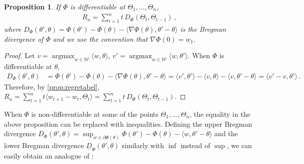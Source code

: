 \documentclass[english]{article}
\newcommand{\todoc}[2][]{\todo[color=Apricot!20,size=\tiny,#1]{C: #2}}
\newcommand{\cW}{\mathcal{W}}
\newcommand{\inpro}[2]{\langle #1, #2\rangle}
\newcommand{\ip}[1]{\langle#1\rangle}
\newcommand{\uD}{\overline{D}}
\newcommand{\lD}{\underline{D}}
\DeclareMathOperator*{\argmax}{argmax}
\newtheorem{prop}[thm]{Proposition}
\begin{document}
\begin{prop} 
\label{prop:R_nBregmanDivergence}
If $\Phi$ is differentiable at $\Theta_1, \ldots, \Theta_n$,  %
\begin{align}
\label{eq:regreteq}
R_n = \sum_{t=1}^{n} t\,D_{\Phi}(\Theta_t,\Theta_{t-1})\,,
\end{align}
where $D_{\Phi}(\theta', \theta) = \Phi(\theta') - \Phi(\theta) - \ip{ \nabla\Phi(\theta), \theta' - \theta}$ is the Bregman divergence of $\Phi$
and
we use the convention that $\nabla\Phi(0) = w_1$.
\end{prop}
\begin{proof}
Let $v = \argmax_{w\in\cW}\inpro{w}{\theta}$, 
$v' = \argmax_{w\in \cW}\ip{w,\theta'}$.
When $\Phi$ is differentiable at $\theta$,
\begin{align}
D_{\Phi}(\theta', \theta) & = \Phi(\theta') - \Phi(\theta) - \inpro{\nabla\Phi(\theta)}{\theta' \!- \theta} 
  =  \inpro{v'}{\theta'} \!- \inpro{v}{\theta} -\inpro{v}{\theta' \!- \theta} = \inpro{v'\!-v}{\theta'}\,. 
\label{eq:bregman}
\end{align}
Therefore, by \cref{prop:regretabel}, $R_n = \sum_{t=1}^{n} t\ip{ w_{t+1}-w_t,\Theta_t} = \sum_{t=1}^{n} t\,D_{\Phi}(\Theta_t,\Theta_{t-1})$.
\end{proof}
When $\Phi$ is non-differentiable at some of the points $\Theta_1,\dots,\Theta_n$, the equality in the above proposition can be replaced with inequalities.
Defining the upper Bregman divergence %
$\uD_{\Phi}(\theta', \theta) 
= \sup_{w\in \partial \Phi(\theta)} \Phi(\theta') - \Phi(\theta) - \ip{ w, \theta' - \theta}$ and the lower Bregman divergence $\lD_{\Phi}(\theta', \theta)$ similarly with $\inf$ instead of $\sup$, 
%
we can easily obtain an analogue of :
\end{document}
